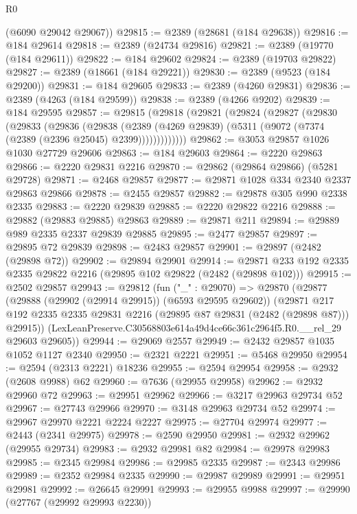 \begin{lexlean}{R0}
\begin{coremodule}
      (@6090 @29042 @29067))
@29815 := @2389 (@28681 (@184 @29638))
@29816 := @184 @29614
@29818 := @2389 (@24734 @29816)
@29821 := @2389 (@19770 (@184 @29611))
@29822 := @184 @29602
@29824 := @2389 (@19703 @29822)
@29827 := @2389 (@18661 (@184 @29221))
@29830 := @2389 (@9523 (@184 @29200))
@29831 := @184 @29605
@29833 := @2389 (@4260 @29831)
@29836 := @2389 (@4263 (@184 @29599))
@29838 := @2389 (@4266 @9202)
@29839 := @184 @29595
@29857 := @29815
    (@29818
      (@29821
        (@29824
          (@29827
            (@29830
              (@29833
                (@29836
                  (@29838
                    (@2389
                      (@4269 @29839)
                      (@5311 (@9072 (@7374 (@2389 (@2396 @25045) @2399)))))))))))))
@29862 := @3053 @29857 @1026 @1030 @27729 @29606
@29863 := @184 @29603
@29864 := @2220 @29863
@29866 := @2220 @29831 @2216
@29870 := @29862 (@29864 @29866) (@5281 @29728)
@29871 := @2468 @29857
@29877 := @29871 @1028 @334 @2340 @2337 @29863 @29866
@29878 := @2455 @29857
@29882 := @29878 @305 @990 @2338 @2335
@29883 := @2220 @29839
@29885 := @2220 @29822 @2216
@29888 := @29882 (@29883 @29885) @29863
@29889 := @29871 @211
@29894 := @29889 @989 @2335 @2337 @29839 @29885
@29895 := @2477 @29857
@29897 := @29895 @72 @29839
@29898 := @2483 @29857
@29901 := @29897 (@2482 (@29898 @72))
@29902 := @29894 @29901
@29914 := @29871 @233 @192 @2335 @2335 @29822 @2216 (@29895 @102 @29822 (@2482 (@29898 @102)))
@29915 := @2502 @29857
@29943 := @29812
    (fun ("_" : @29070) =>
    @29870
      (@29877
        (@29888 (@29902 (@29914 @29915)) (@6593 @29595 @29602))
        (@29871 @217 @192 @2335 @2335 @29831 @2216 (@29895 @87 @29831 (@2482 (@29898 @87))) @29915))
      (LexLeanPreserve.C30568803e614a49d4ce66c361c2964f5.R0.__rel_29 @29603 @29605))
@29944 := @29069 @2557
@29949 := @2432 @29857 @1035 @1052 @1127 @2340
@29950 := @2321 @2221
@29951 := @5468 @29950
@29954 := @2594 (@2313 @2221) @18236
@29955 := @2594 @29954
@29958 := @2932 (@2608 @9988) @62
@29960 := @7636 (@29955 @29958)
@29962 := @2932 @29960 @72
@29963 := @29951 @29962
@29966 := @3217 @29963 @29734 @52
@29967 := @27743 @29966
@29970 := @3148 @29963 @29734 @52
@29974 := @29967 @29970 @2221 @2224 @2227
@29975 := @27704 @29974
@29977 := @2443 (@2341 @29975)
@29978 := @2590 @29950
@29981 := @2932 @29962 (@29955 @29734)
@29983 := @2932 @29981 @82
@29984 := @29978 @29983
@29985 := @2345 @29984
@29986 := @29985 @2335
@29987 := @2343 @29986
@29989 := @2352 @29984 @2335
@29990 := @29987 @29989
@29991 := @29951 @29981
@29992 := @26645 @29991
@29993 := @29955 @9988
@29997 := @29990 (@27767 (@29992 @29993 @2230))

\end{coremodule}
\end{lexlean}
